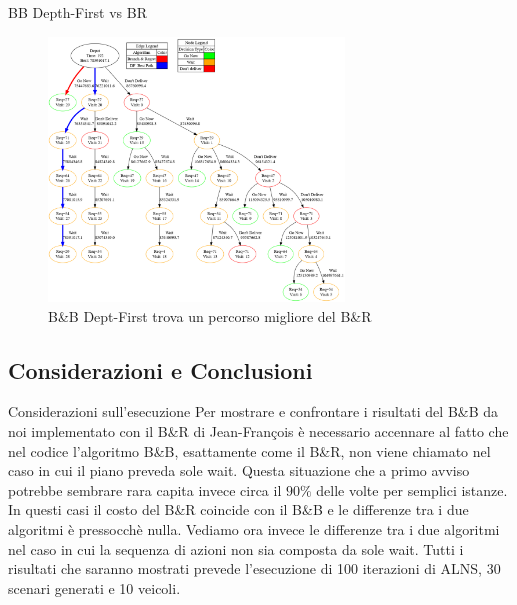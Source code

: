 \documentclass[10pt]{beamer}
\begin{document}
    \begin{frame}{BB Depth-First vs BR}
           \begin{figure}[h!]
                \centering
                \includegraphics[width=0.7\textwidth]{Images/good_shit.png}
                \caption{B\&B Dept-First trova un percorso migliore del B\&R}
                \label{fig:BBDFmigliore}
            \end{figure}
    \end{frame}
    
    \subsection{Considerazioni e Conclusioni}\label{sec:considerazioni-conclusioni}

    \begin{frame}{Considerazioni sull'esecuzione}
        Per mostrare e confrontare i risultati del B\&B da noi implementato con il B\&R di Jean-François è necessario accennare al fatto che nel codice l'algoritmo B\&B, esattamente come il B\&R, non viene chiamato nel caso in cui il piano preveda sole wait. Questa situazione che a primo avviso potrebbe sembrare rara capita invece circa il $90\%$ delle volte per semplici istanze. In questi casi il costo del B\&R coincide con il B\&B e le differenze tra i due algoritmi è pressocchè nulla. Vediamo ora invece le differenze tra i due algoritmi nel caso in cui la sequenza di azioni non sia composta da sole wait. Tutti i risultati che saranno mostrati prevede l'esecuzione di 100 iterazioni di ALNS, 30 scenari generati e 10 veicoli.
    \end{frame}
\end{document}
